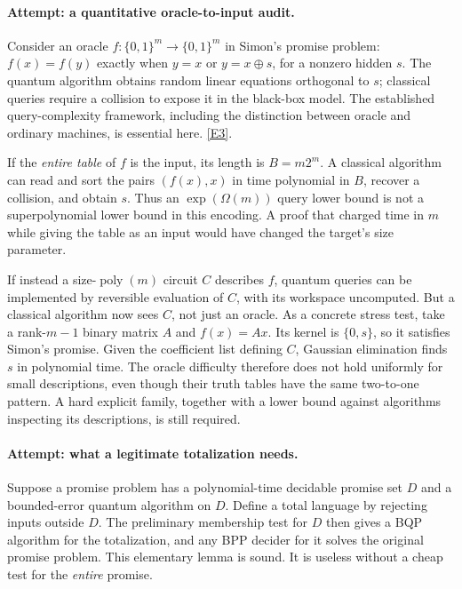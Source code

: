 \documentclass[11pt,a4paper]{article}
\newcommand{\eref}[2]{\hyperlink{extra:#1:#2}{[E#2]}}
\begin{document}
\paragraph{Attempt: a quantitative oracle-to-input audit.}
Consider an oracle $f:\{0,1\}^m\to\{0,1\}^m$ in Simon's promise problem:
$f(x)=f(y)$ exactly when $y=x$ or $y=x\oplus s$, for a nonzero hidden $s$.
The quantum algorithm obtains random linear equations orthogonal to $s$;
classical queries require a collision to expose it in the black-box model.
The established query-complexity framework, including the distinction
between oracle and ordinary machines, is essential here. \eref{30006683}{3}.

If the \emph{entire table} of $f$ is the input, its length is
$B=m2^m$. A classical algorithm can read and sort the pairs $(f(x),x)$ in
time polynomial in $B$, recover a collision, and obtain $s$. Thus an
$\exp(\Omega(m))$ query lower bound is not a superpolynomial lower bound
in this encoding. A proof that charged time in $m$ while giving the table
as an input would have changed the target's size parameter.

If instead a size-$\operatorname{poly}(m)$ circuit $C$ describes $f$, quantum
queries can be implemented by reversible evaluation of $C$, with its
workspace uncomputed. But a classical algorithm now sees $C$, not just
an oracle. As a concrete stress test, take a rank-$m-1$ binary matrix $A$
and $f(x)=Ax$. Its kernel is $\{0,s\}$, so it satisfies Simon's promise.
Given the coefficient list defining $C$, Gaussian elimination finds $s$
in polynomial time. The oracle difficulty therefore does not hold
uniformly for small descriptions, even though their truth tables have the
same two-to-one pattern. A hard explicit family, together with a lower
bound against algorithms inspecting its descriptions, is still required.

\paragraph{Attempt: what a legitimate totalization needs.}
Suppose a promise problem has a polynomial-time decidable promise set $D$
and a bounded-error quantum algorithm on $D$. Define a total language by
rejecting inputs outside $D$. The preliminary membership test for $D$
then gives a BQP algorithm for the totalization, and any BPP decider for
it solves the original promise problem. This elementary lemma is sound.
It is useless without a cheap test for the \emph{entire} promise.
\end{document}
